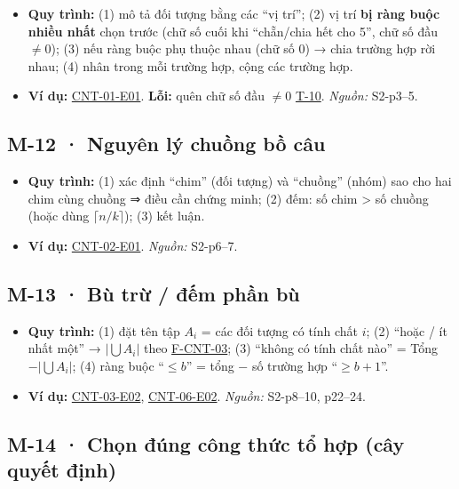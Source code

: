 \documentclass[
  10pt,
  twoside,openany]{book}
\providecommand{\tightlist}{%
  \setlength{\itemsep}{0pt}\setlength{\parskip}{0pt}}
\begin{document}
\begin{itemize}
\tightlist
\item
  \textbf{Quy trình:} (1) mô tả đối tượng bằng các ``vị trí''; (2) vị
  trí \textbf{bị ràng buộc nhiều nhất} chọn trước (chữ số cuối khi
  ``chẵn/chia hết cho 5'', chữ số đầu \(\ne0\)); (3) nếu ràng buộc phụ
  thuộc nhau (chữ số 0) → chia trường hợp rời nhau; (4) nhân trong mỗi
  trường hợp, cộng các trường hợp.
\item
  \textbf{Ví dụ:} \protect\hyperlink{CNT-01-E01}{CNT-01-E01}.
  \textbf{Lỗi:} quên chữ số đầu \(\ne0\) \protect\hyperlink{T-10}{T-10}.
  \emph{Nguồn:} S2-p3--5.
\end{itemize}

\hypertarget{M-12}{%
\subsection{M-12 · Nguyên lý chuồng bồ câu}\label{M-12}}

\begin{itemize}
\tightlist
\item
  \textbf{Quy trình:} (1) xác định ``chim'' (đối tượng) và ``chuồng''
  (nhóm) sao cho hai chim cùng chuồng ⇒ điều cần chứng minh; (2) đếm: số
  chim \textgreater{} số chuồng (hoặc dùng \(\lceil n/k\rceil\)); (3)
  kết luận.
\item
  \textbf{Ví dụ:} \protect\hyperlink{CNT-02-E01}{CNT-02-E01}.
  \emph{Nguồn:} S2-p6--7.
\end{itemize}

\hypertarget{M-13}{%
\subsection{M-13 · Bù trừ / đếm phần bù}\label{M-13}}

\begin{itemize}
\tightlist
\item
  \textbf{Quy trình:} (1) đặt tên tập \(A_i\) = các đối tượng có tính
  chất \(i\); (2) ``hoặc / ít nhất một'' → \(|\bigcup A_i|\) theo
  \protect\hyperlink{F-CNT-03}{F-CNT-03}; (3) ``không có tính chất nào''
  = Tổng \(-|\bigcup A_i|\); (4) ràng buộc ``\(\le b\)'' = tổng − số
  trường hợp ``\(\ge b+1\)''.
\item
  \textbf{Ví dụ:} \protect\hyperlink{CNT-03-E02}{CNT-03-E02},
  \protect\hyperlink{CNT-06-E02}{CNT-06-E02}. \emph{Nguồn:} S2-p8--10,
  p22--24.
\end{itemize}

\hypertarget{M-14}{%
\subsection{M-14 · Chọn đúng công thức tổ hợp (cây quyết
định)}\label{M-14}}
\end{document}
